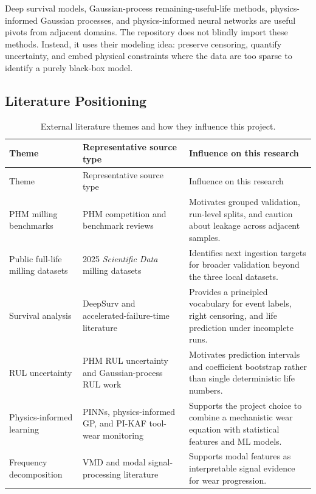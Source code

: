 \documentclass[11pt,a4paper]{article}
\begin{document}
Deep survival models, Gaussian-process remaining-useful-life methods, physics-informed Gaussian processes, and physics-informed neural networks are useful pivots from adjacent domains. The repository does not blindly import these methods. Instead, it uses their modeling idea: preserve censoring, quantify uncertainty, and embed physical constraints where the data are too sparse to identify a purely black-box model.

\subsection{Literature Positioning}

\begin{longtable}{p{3.0cm}p{4.0cm}p{6.7cm}}
  \caption{External literature themes and how they influence this project.}
  \label{tab:literature-themes}\\
  \toprule
  Theme & Representative source type & Influence on this research \\
  \midrule
  \endfirsthead
  \toprule
  Theme & Representative source type & Influence on this research \\
  \midrule
  \endhead
  PHM milling benchmarks & PHM competition and benchmark reviews & Motivates grouped validation, run-level splits, and caution about leakage across adjacent samples. \\
  Public full-life milling datasets & 2025 \emph{Scientific Data} milling datasets & Identifies next ingestion targets for broader validation beyond the three local datasets. \\
  Survival analysis & DeepSurv and accelerated-failure-time literature & Provides a principled vocabulary for event labels, right censoring, and life prediction under incomplete runs. \\
  RUL uncertainty & PHM RUL uncertainty and Gaussian-process RUL work & Motivates prediction intervals and coefficient bootstrap rather than single deterministic life numbers. \\
  Physics-informed learning & PINNs, physics-informed GP, and PI-KAF tool-wear monitoring & Supports the project choice to combine a mechanistic wear equation with statistical features and ML models. \\
  Frequency decomposition & VMD and modal signal-processing literature & Supports modal features as interpretable signal evidence for wear progression. \\
  \bottomrule
\end{longtable}
\end{document}
